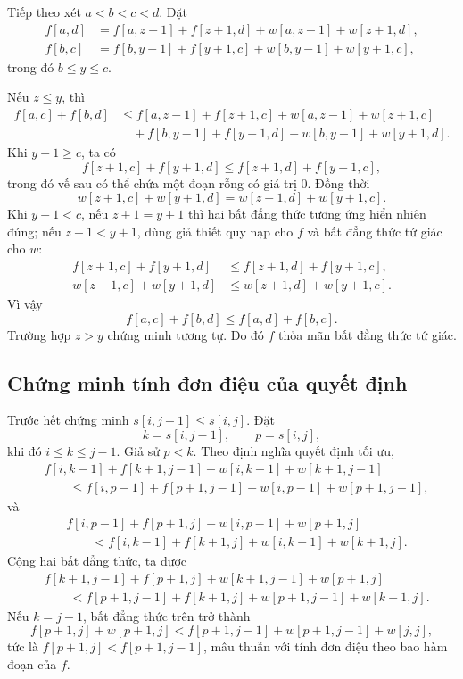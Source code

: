 \documentclass[11pt]{article}
\begin{document}
Tiếp theo xét $a<b<c<d$. Đặt
\[
\begin{aligned}
  f[a,d]&=f[a,z-1]+f[z+1,d]+w[a,z-1]+w[z+1,d],\\
  f[b,c]&=f[b,y-1]+f[y+1,c]+w[b,y-1]+w[y+1,c],
\end{aligned}
\]
trong đó $b\le y\le c$.

Nếu $z\le y$, thì
\[
\begin{aligned}
  f[a,c]+f[b,d]
  &\le f[a,z-1]+f[z+1,c]+w[a,z-1]+w[z+1,c]\\
  &\quad +f[b,y-1]+f[y+1,d]+w[b,y-1]+w[y+1,d].
\end{aligned}
\]
Khi $y+1\ge c$, ta có
\[
  f[z+1,c]+f[y+1,d]\le f[z+1,d]+f[y+1,c],
\]
trong đó vế sau có thể chứa một đoạn rỗng có giá trị $0$. Đồng thời
\[
  w[z+1,c]+w[y+1,d]=w[z+1,d]+w[y+1,c].
\]
Khi $y+1<c$, nếu $z+1=y+1$ thì hai bất đẳng thức tương ứng hiển nhiên đúng;
nếu $z+1<y+1$, dùng giả thiết quy nạp cho $f$ và bất đẳng thức tứ giác cho
$w$:
\[
\begin{aligned}
  f[z+1,c]+f[y+1,d]
  &\le f[z+1,d]+f[y+1,c],\\
  w[z+1,c]+w[y+1,d]
  &\le w[z+1,d]+w[y+1,c].
\end{aligned}
\]
Vì vậy
\[
  f[a,c]+f[b,d]\le f[a,d]+f[b,c].
\]
Trường hợp $z>y$ chứng minh tương tự. Do đó $f$ thỏa mãn bất đẳng thức tứ
giác.

\subsection*{Chứng minh tính đơn điệu của quyết định}

Trước hết chứng minh $s[i,j-1]\le s[i,j]$. Đặt
\[
  k=s[i,j-1],\qquad p=s[i,j],
\]
khi đó $i\le k\le j-1$. Giả sử $p<k$. Theo định nghĩa quyết định tối ưu,
\[
\begin{aligned}
  &f[i,k-1]+f[k+1,j-1]+w[i,k-1]+w[k+1,j-1]\\
  &\qquad \le
  f[i,p-1]+f[p+1,j-1]+w[i,p-1]+w[p+1,j-1],
\end{aligned}
\]
và
\[
\begin{aligned}
  &f[i,p-1]+f[p+1,j]+w[i,p-1]+w[p+1,j]\\
  &\qquad <
  f[i,k-1]+f[k+1,j]+w[i,k-1]+w[k+1,j].
\end{aligned}
\]
Cộng hai bất đẳng thức, ta được
\[
\begin{aligned}
  &f[k+1,j-1]+f[p+1,j]+w[k+1,j-1]+w[p+1,j]\\
  &\qquad <
  f[p+1,j-1]+f[k+1,j]+w[p+1,j-1]+w[k+1,j].
\end{aligned}
\]
Nếu $k=j-1$, bất đẳng thức trên trở thành
\[
  f[p+1,j]+w[p+1,j]
  < f[p+1,j-1]+w[p+1,j-1]+w[j,j],
\]
tức là $f[p+1,j]<f[p+1,j-1]$, mâu thuẫn với tính đơn điệu theo bao hàm đoạn
của $f$.
\end{document}
